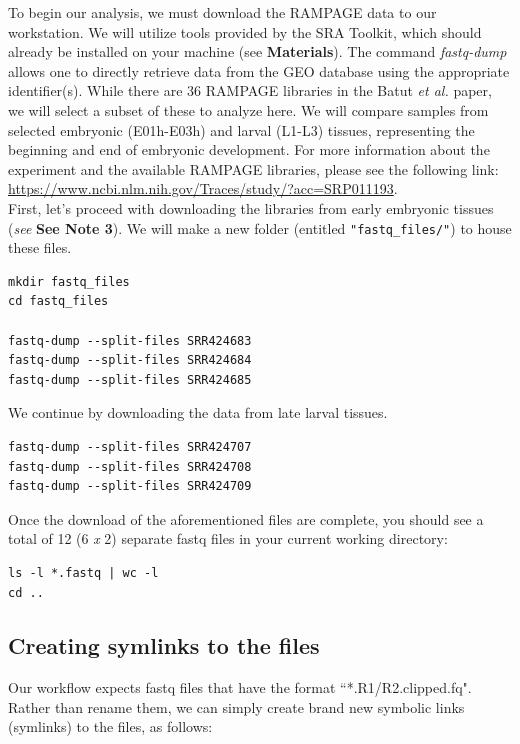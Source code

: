 \documentclass[runningheads,a4paper]{llncs}
\begin{document}
\begin{linenumbers}
To begin our analysis, we must download the RAMPAGE data to our workstation. 
We will utilize tools provided by the SRA Toolkit, which should already be installed on your machine (see \textbf{Materials}).
The command \textit{fastq-dump} allows one to directly retrieve data from the GEO database using the appropriate identifier(s).
While there are 36 RAMPAGE libraries in the Batut \textit{et al.} paper, we will select a subset of these to analyze here.
We will compare samples from selected embryonic (E01h-E03h) and larval (L1-L3) tissues, representing the beginning and end of embryonic development.
For more information about the experiment and the available RAMPAGE libraries, please see the following link: \url{https://www.ncbi.nlm.nih.gov/Traces/study/?acc=SRP011193}.\\

\noindent
First, let's proceed with downloading the libraries from early embryonic tissues (\textit{see} \textbf{See Note 3}).
We will make a new folder (entitled \texttt{"fastq\_files/"}) to house these files.

\noindent
\begin{verbatim}
mkdir fastq_files
cd fastq_files

fastq-dump --split-files SRR424683
fastq-dump --split-files SRR424684
fastq-dump --split-files SRR424685
\end{verbatim}

\noindent
We continue by downloading the data from late larval tissues.

\begin{verbatim}
fastq-dump --split-files SRR424707
fastq-dump --split-files SRR424708
fastq-dump --split-files SRR424709
\end{verbatim}

\noindent
Once the download of the aforementioned files are complete, you should see a total of 12 (6 \textit{x} 2) separate fastq files in your current working directory:

\noindent
\begin{verbatim}
ls -l *.fastq | wc -l
cd ..
\end{verbatim}

\subsection{Creating symlinks to the files}
Our workflow expects fastq files that have the format ``*.R1/R2.clipped.fq". 
Rather than rename them, we can simply create brand new symbolic links (symlinks) to the files, as follows:


\end{linenumbers}
\end{document}
